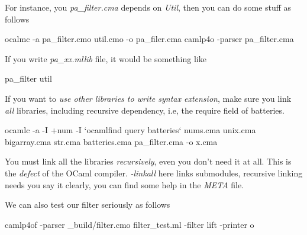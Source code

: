 For instance, you \textit{pa\_filter.cma} depends on \textit{Util}, then
you can do some stuff as follows

\begin{bashcode}
  ocalmc -a pa_filter.cmo util.cmo -o pa_filer.cma
  camlp4o -parser pa_filter.cma  
\end{bashcode}

If you write \textit{pa_xx.mllib} file, it would be something like

\begin{bashcode}
pa_filter
util
\end{bashcode}
If you want to \textit{use other libraries to write syntax extension}, make
sure you link \textit{all} libraries, including recursive dependency,
i.e, the require field of batteries.

\begin{bashcode}
ocamlc -a  -I +num -I `ocamlfind query batteries` nums.cma unix.cma
bigarray.cma str.cma batteries.cma pa_filter.cma -o x.cma
\end{bashcode}

You must link all the libraries \textit{recursively}, even you don't
need it at all. This is the \textit{defect} of the OCaml compiler.
\textit{-linkall} here links submodules, recursive linking needs you say
it clearly, you can find some help in the \textit{META} file.

We can also test our filter seriously as follows

\begin{bashcode}
camlp4of -parser _build/filter.cmo filter_test.ml -filter lift -printer o   
\end{bashcode}

